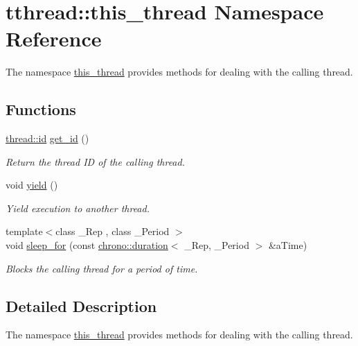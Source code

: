 \hypertarget{namespacetthread_1_1this__thread}{}\section{tthread\+:\+:this\+\_\+thread Namespace Reference}
\label{namespacetthread_1_1this__thread}


The namespace {\ttfamily \hyperlink{namespacetthread_1_1this__thread}{this\+\_\+thread}} provides methods for dealing with the calling thread.  


\subsection*{Functions}
\begin{DoxyCompactItemize}
\item 
\hyperlink{classtthread_1_1thread_1_1id}{thread\+::id} \hyperlink{namespacetthread_1_1this__thread_ab9370620a3920b9ec550f84fb44fb032}{get\+\_\+id} ()\hypertarget{namespacetthread_1_1this__thread_ab9370620a3920b9ec550f84fb44fb032}{}\label{namespacetthread_1_1this__thread_ab9370620a3920b9ec550f84fb44fb032}

\begin{DoxyCompactList}\small\item\em Return the thread ID of the calling thread. \end{DoxyCompactList}\item 
void \hyperlink{namespacetthread_1_1this__thread_a867ef7ad1dd6026b7ee13bb013e00edd}{yield} ()
\begin{DoxyCompactList}\small\item\em Yield execution to another thread. \end{DoxyCompactList}\item 
{\footnotesize template$<$class \+\_\+\+Rep , class \+\_\+\+Period $>$ }\\void \hyperlink{namespacetthread_1_1this__thread_a5dfe77c8ca4df7d32511caa2cb7ffa7f}{sleep\+\_\+for} (const \hyperlink{classtthread_1_1chrono_1_1duration}{chrono\+::duration}$<$ \+\_\+\+Rep, \+\_\+\+Period $>$ \&a\+Time)
\begin{DoxyCompactList}\small\item\em Blocks the calling thread for a period of time. \end{DoxyCompactList}\end{DoxyCompactItemize}


\subsection{Detailed Description}
The namespace {\ttfamily \hyperlink{namespacetthread_1_1this__thread}{this\+\_\+thread}} provides methods for dealing with the calling thread. 



